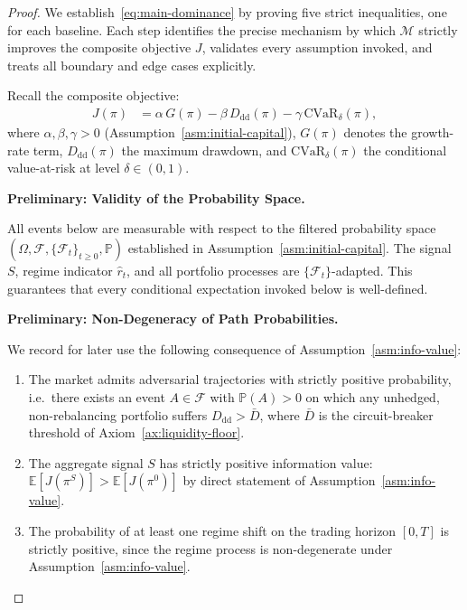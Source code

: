 \documentclass[12pt,openany]{book}
\newcommand{\E}{\mathbb{E}}
\numberwithin{equation}{chapter}
\theoremstyle{plain}
\theoremstyle{definition}
\theoremstyle{remark}
\numberwithin{equation}{chapter}
\theoremstyle{plain}
\begin{document}
\begin{proof}
We establish~\eqref{eq:main-dominance} by proving five strict
inequalities, one for each baseline.  Each step identifies the
precise mechanism by which $\mathcal{M}$ strictly improves the
composite objective $J$, validates every assumption invoked, and
treats all boundary and edge cases explicitly.

Recall the composite objective:
\begin{align}
  J(\pi)
  &= \alpha\,G(\pi)
     - \beta\,D_{\mathrm{dd}}(\pi)
     - \gamma\,\mathrm{CVaR}_{\delta}(\pi),
  \label{eq:J-recall}
\end{align}
where $\alpha,\beta,\gamma > 0$ (Assumption~\ref{asm:initial-capital}),
$G(\pi)$ denotes the growth-rate term, $D_{\mathrm{dd}}(\pi)$ the
maximum drawdown, and $\mathrm{CVaR}_{\delta}(\pi)$ the conditional
value-at-risk at level $\delta \in (0,1)$.

\bigskip
\noindent\textbf{Preliminary: Validity of the Probability Space.}

All events below are measurable with respect to the filtered
probability space $(\Omega,\mathcal{F},\{\mathcal{F}_t\}_{t\geq 0},
\mathbb{P})$ established in Assumption~\ref{asm:initial-capital}.
The signal $S$, regime indicator $\hat{r}_t$, and all portfolio
processes are $\{\mathcal{F}_t\}$-adapted.  This guarantees that
every conditional expectation invoked below is well-defined.

\bigskip
\noindent\textbf{Preliminary: Non-Degeneracy of Path Probabilities.}

We record for later use the following consequence of
Assumption~\ref{asm:info-value}:

\begin{enumerate}[label=(\alph*)]
  \item \label{prelim:a} The market admits adversarial trajectories
        with strictly positive probability, i.e.\ there exists an event
        $A \in \mathcal{F}$ with $\mathbb{P}(A) > 0$ on which
        any unhedged, non-rebalancing portfolio suffers
        $D_{\mathrm{dd}} > \bar{D}$, where $\bar{D}$ is the
        circuit-breaker threshold of Axiom~\ref{ax:liquidity-floor}.
  \item \label{prelim:b} The aggregate signal $S$ has strictly
        positive information value: $\E[J(\pi^{S})] > \E[J(\pi^{0})]$
        by direct statement of Assumption~\ref{asm:info-value}.
  \item \label{prelim:c} The probability of at least one regime shift
        on the trading horizon $[0,T]$ is strictly positive, since
        the regime process is non-degenerate under
        Assumption~\ref{asm:info-value}.
\end{enumerate}


\end{proof}
\end{document}
